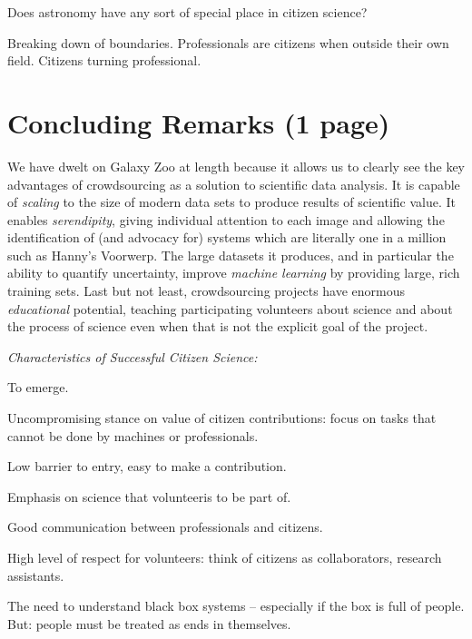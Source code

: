 \documentclass{ar2e}
\begin{document}
Does astronomy have any sort of special place in citizen science?

Breaking down of boundaries. Professionals are citizens when outside their own
field. Citizens turning professional.


\section{Concluding Remarks (1 page)}
\label{sec:conclusions}


We have dwelt on Galaxy Zoo at length because it allows us to clearly see the
key advantages of crowdsourcing as a solution to scientific data analysis. It
is capable of \emph{scaling} to the size of modern data sets to produce
results of scientific value. It enables \emph{serendipity}, giving individual
attention to each image and allowing the identification of (and advocacy for)
systems which are literally one in a million such as Hanny's Voorwerp. The
large datasets it produces, and in particular the ability to quantify
uncertainty, improve \emph{machine learning} by providing large, rich training
sets. Last but not least, crowdsourcing projects have enormous
\emph{educational} potential, teaching participating volunteers about science
and about the process of science even when that is not the explicit goal of
the project. 


{\it Characteristics of Successful Citizen Science:}


To emerge.

Uncompromising stance on value of citizen contributions: focus on tasks that
cannot be done by machines or professionals.

Low barrier to entry, easy to make a contribution.

Emphasis on science that volunteeris to be part of. 

Good communication between professionals and citizens.

High level of respect for volunteers: think of citizens as collaborators,
research assistants.

The need to understand black box systems -- especially if the box is full of
people. But: people must be treated as ends in themselves. 
\end{document}

